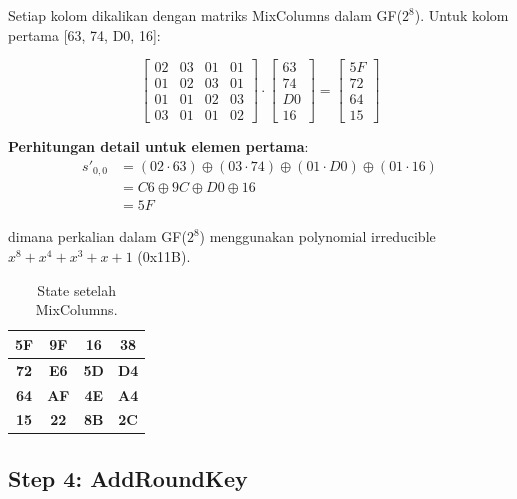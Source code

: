 Setiap kolom dikalikan dengan matriks MixColumns dalam GF($2^8$). Untuk kolom pertama [63, 74, D0, 16]:

\[
\begin{bmatrix}
02 & 03 & 01 & 01 \\
01 & 02 & 03 & 01 \\
01 & 01 & 02 & 03 \\
03 & 01 & 01 & 02
\end{bmatrix}
\cdot
\begin{bmatrix}
63 \\ 74 \\ D0 \\ 16
\end{bmatrix}
=
\begin{bmatrix}
5F \\ 72 \\ 64 \\ 15
\end{bmatrix}
\]

\textbf{Perhitungan detail untuk elemen pertama}:
\begin{align*}
s'_{0,0} &= (02 \cdot 63) \oplus (03 \cdot 74) \oplus (01 \cdot D0) \oplus (01 \cdot 16) \\
&= C6 \oplus 9C \oplus D0 \oplus 16 \\
&= 5F
\end{align*}

dimana perkalian dalam GF($2^8$) menggunakan polynomial irreducible $x^8 + x^4 + x^3 + x + 1$ (0x11B).

\begin{table}[htbp]
  \centering
  \small
  \begin{tabular}{|c|c|c|c|}
    \hline
    \textbf{5F} & \textbf{9F} & \textbf{16} & \textbf{38} \\
    \hline
    \textbf{72} & \textbf{E6} & \textbf{5D} & \textbf{D4} \\
    \hline
    \textbf{64} & \textbf{AF} & \textbf{4E} & \textbf{A4} \\
    \hline
    \textbf{15} & \textbf{22} & \textbf{8B} & \textbf{2C} \\
    \hline
  \end{tabular}
  \caption{State setelah MixColumns.}
\end{table}

\subsection{Step 4: AddRoundKey}

